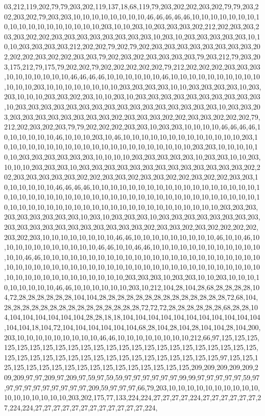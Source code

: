 03,212,119,202,79,79,203,202,119,137,18,68,119,79,203,202,202,203,202,79,79,203,202,203,202,79,203,203,10,10,10,10,10,10,10,10,46,46,46,46,46,10,10,10,10,10,10,10,10,10,10,10,10,10,10,10,10,10,10,203,10,10,203,10,203,203,203,202,212,202,203,203,203,203,202,202,203,203,203,203,203,203,203,203,10,203,10,203,203,203,203,203,10,10,10,203,203,203,203,212,202,202,79,202,79,202,203,203,203,203,203,203,203,203,202,202,202,203,202,202,203,203,79,202,203,202,203,203,203,203,79,203,212,79,203,203,175,212,79,175,79,202,202,79,202,202,202,202,202,79,212,202,202,202,203,203,203,10,10,10,10,10,10,10,46,46,46,46,10,10,10,10,10,10,46,10,10,10,10,10,10,10,10,10,10,10,10,10,203,10,10,10,10,10,10,10,10,203,203,203,203,10,10,203,203,203,203,10,203,203,10,10,10,203,203,202,203,10,10,203,10,203,203,203,203,203,203,203,203,203,203,10,203,203,203,203,203,203,203,203,203,203,203,203,203,203,203,203,10,203,203,203,203,203,203,203,203,203,203,203,202,203,203,203,202,202,203,203,202,202,202,79,212,202,203,202,203,79,79,202,202,202,203,203,10,203,203,10,10,10,10,46,46,46,46,10,10,10,10,10,10,46,10,10,10,203,10,46,10,10,10,10,10,10,10,10,10,10,10,10,10,203,10,10,10,10,10,10,10,10,10,10,10,10,10,10,10,10,10,10,10,10,10,203,203,10,10,10,10,10,10,203,203,203,203,203,203,10,10,10,10,203,203,203,203,203,10,203,203,10,10,203,10,10,10,203,203,203,10,203,203,203,203,203,203,203,203,203,203,203,203,203,202,202,203,203,203,203,203,202,202,203,203,202,203,203,202,202,203,202,202,203,203,10,10,10,10,10,10,46,46,46,46,10,10,10,10,10,10,10,10,10,10,10,10,10,10,10,10,10,10,10,10,10,10,10,10,10,10,10,10,10,10,10,10,10,10,10,10,10,10,10,10,10,10,10,10,10,10,10,10,10,10,10,10,10,10,10,10,10,10,10,10,10,10,10,10,10,10,10,10,10,10,203,203,203,203,203,203,203,203,203,10,203,10,203,203,203,10,203,203,203,203,203,203,203,203,203,203,203,203,203,203,203,203,203,203,203,202,203,203,202,203,202,202,202,202,203,202,203,10,10,10,10,10,10,10,10,46,46,10,10,10,10,10,10,10,10,10,46,10,10,46,10,10,10,10,10,10,10,10,10,10,10,46,46,10,10,46,46,10,10,10,10,10,10,10,10,10,10,10,10,10,10,46,46,10,10,10,10,10,10,10,10,10,10,10,10,10,10,10,10,10,10,10,10,10,10,10,10,10,10,10,10,10,10,10,10,10,10,10,10,10,10,10,10,10,10,10,10,10,10,10,10,10,10,10,10,10,10,10,10,10,10,10,10,10,10,10,10,10,203,203,203,10,203,203,10,10,203,10,10,10,10,10,10,10,10,10,46,46,10,10,10,10,10,10,203,10,212,104,28,104,28,68,28,28,28,28,104,72,28,28,28,28,28,28,104,104,28,28,28,28,28,28,28,28,28,28,28,28,28,28,72,68,104,28,28,28,28,28,28,28,28,28,28,28,28,28,28,28,72,72,72,28,28,28,28,28,28,68,28,28,104,104,104,104,104,104,104,28,28,18,18,104,104,104,104,104,104,104,104,104,104,104,104,104,18,104,72,104,104,104,104,104,104,68,28,104,28,104,28,104,104,28,104,200,203,10,10,10,10,10,10,10,10,10,46,46,10,10,10,10,10,10,10,10,212,66,97,125,125,125,125,125,125,125,125,125,125,125,125,125,125,125,125,125,125,125,125,125,125,125,125,125,125,125,125,125,125,125,125,125,125,125,125,125,125,125,125,97,125,125,125,125,125,125,125,125,125,125,125,125,125,125,125,125,125,209,209,209,209,209,209,209,97,97,209,97,209,97,59,97,59,59,97,97,97,97,97,97,99,99,97,97,97,97,97,59,97,97,97,97,97,97,97,97,97,97,209,59,97,97,97,66,79,203,10,10,10,10,10,10,10,10,10,10,10,10,10,10,10,10,10,203,202,175,77,133,224,224,27,27,27,27,224,27,27,27,27,27,27,27,224,224,27,27,27,27,27,27,27,27,27,27,27,27,224,